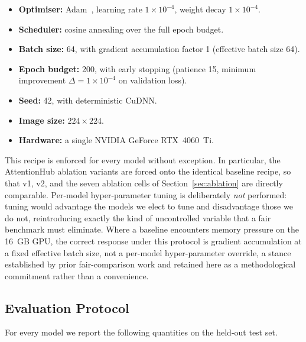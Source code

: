 \begin{itemize}
  \item \textbf{Optimiser:} Adam~\cite{kingma2015adam}, learning rate
  $1\times10^{-4}$, weight decay $1\times10^{-4}$.
  \item \textbf{Scheduler:} cosine annealing over the full epoch budget.
  \item \textbf{Batch size:} 64, with gradient accumulation factor 1
  (effective batch size 64).
  \item \textbf{Epoch budget:} 200, with early stopping (patience 15,
  minimum improvement $\Delta = 1\times10^{-4}$ on validation loss).
  \item \textbf{Seed:} 42, with deterministic CuDNN.
  \item \textbf{Image size:} $224\times224$.
  \item \textbf{Hardware:} a single NVIDIA GeForce RTX~4060~Ti.
\end{itemize}

This recipe is enforced for every model without exception. In particular,
the AttentionHub ablation variants are forced onto the identical baseline
recipe, so that v1, v2, and the seven ablation cells of
Section~\ref{sec:ablation} are directly comparable. Per-model
hyper-parameter tuning is deliberately \emph{not} performed: tuning would
advantage the models we elect to tune and disadvantage those we do not,
reintroducing exactly the kind of uncontrolled variable that a fair
benchmark must eliminate. Where a baseline encounters memory pressure on the
16~GB GPU, the correct response under this protocol is gradient
accumulation at a fixed effective batch size, not a per-model
hyper-parameter override, a stance established by prior fair-comparison
work and retained here as a methodological commitment rather than a
convenience.

\subsection{Evaluation Protocol}\label{ssec:evaluation}

For every model we report the following quantities on the held-out test
set.

